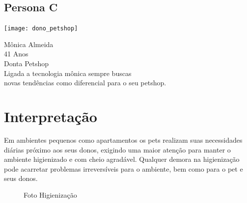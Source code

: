\documentclass[12pt,a4paper]{article}
\let\oldsection\section
\renewcommand\section{\clearpage\oldsection}
\begin{document}
\subsection{Persona C}

\begin{minipage}{0.3\textwidth}
	\texttt{[image: dono\_petshop]}
\end{minipage}
\hfill
\begin{minipage}{0.6\textwidth}\raggedleft
	Mônica Almeida\\
	41 Anos \\
	Donta Petshop\\
	Ligada a tecnologia mônica sempre buscas \\
	novas tendências como diferencial para o seu petshop.
\end{minipage}

\section{Interpretação}
Em ambientes pequenos como apartamentos os pets realizam suas necessidades
diárias próximo aos seus donos, exigindo uma maior atenção para manter o
ambiente higienizado e com cheio agradável. Qualquer demora na higienização
pode acarretar problemas irreversíveis para o ambiente, bem como para o pet
e seus donos.

\begin{figure}[htb!]
	\centering
	\qquad
	\qquad
	\caption{Foto Higienização}
	\label{fig:higienizacao}
\end{figure}
\end{document}
